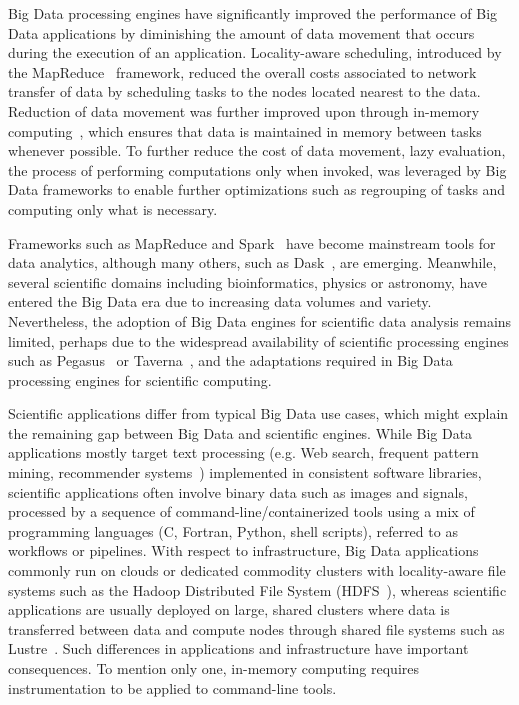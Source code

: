 Big Data processing engines have significantly improved the performance of Big Data
applications by diminishing the amount 
of data movement that occurs during the execution of an application. Locality-aware
scheduling, introduced by the MapReduce~\cite{dean2008mapreduce} framework, reduced the overall
costs associated to network transfer of data by scheduling tasks to the nodes located nearest to
the data. Reduction of data movement was further improved upon through in-memory computing~\cite{zaharia2016apache},
which ensures that data is maintained in memory between tasks whenever possible. To further
reduce the cost of data movement, lazy evaluation, the process of performing computations only when invoked,
was leveraged by Big Data frameworks to enable further optimizations such as regrouping of tasks and
computing only what is necessary.

Frameworks such as
MapReduce and Spark~\cite{zaharia2016apache} have become mainstream tools for data analytics, although many
others, such as Dask~\cite{rocklin2015dask}, are emerging.
Meanwhile, several scientific 
domains including bioinformatics, physics or astronomy, have entered 
the Big Data era due to increasing data volumes and variety. 
Nevertheless, the adoption of Big Data engines for scientific data analysis 
remains limited, perhaps due to the widespread availability of 
scientific processing engines such as Pegasus~\cite{deelman2005pegasus} or
Taverna~\cite{oinn2004taverna}, and the adaptations required in Big 
Data processing engines for scientific computing. 

Scientific applications differ from typical Big Data use 
cases, which might explain the remaining gap between Big Data and 
scientific engines. While Big Data applications mostly target text 
processing (e.g. Web search, frequent pattern mining, recommender 
systems~\cite{leskovec2014mining}) implemented in consistent software 
libraries, scientific applications often involve 
binary data such as images and signals, processed by a sequence of 
command-line/containerized tools
using a mix of programming languages (C, Fortran, Python, shell 
scripts), referred to as workflows or pipelines. With respect to infrastructure, 
Big Data applications commonly run on 
clouds or dedicated commodity clusters with locality-aware file systems 
such as the Hadoop Distributed File System 
(HDFS~\cite{shvachko2010hadoop}), whereas scientific applications are 
usually deployed on large, shared clusters where data is transferred between
data and compute nodes through shared file systems such 
as Lustre~\cite{schwan2003lustre}. Such differences in applications and 
infrastructure have important consequences. To 
mention only one, in-memory computing requires instrumentation to be 
applied to command-line tools. 


